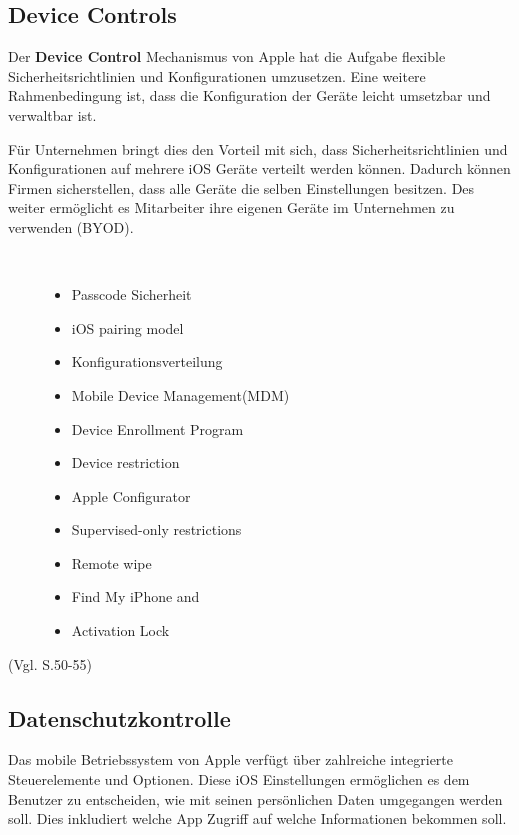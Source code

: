 \subsection{Device Controls}
\label{sec:DeviceControl}

Der \textbf{Device Control} Mechanismus von Apple hat die Aufgabe flexible Sicherheitsrichtlinien und Konfigurationen umzusetzen. Eine weitere Rahmenbedingung ist, dass die Konfiguration der Geräte leicht umsetzbar und verwaltbar ist.\par 
 Für Unternehmen bringt dies den Vorteil mit sich, dass Sicherheitsrichtlinien und Konfigurationen auf mehrere iOS Geräte verteilt werden können. Dadurch können Firmen sicherstellen, dass alle Geräte die selben Einstellungen besitzen. Des weiter ermöglicht es Mitarbeiter ihre eigenen Geräte im Unternehmen zu verwenden (BYOD). 

\begin{description}
    \item[\parbox{\textwidth} {Dies sind die Mainfeature des Apple Device Control Service} ]~\par
    \begin{multicols}{2}
    \begin{itemize}
        \item Passcode Sicherheit
        \item iOS pairing model
        \item Konfigurationsverteilung
        \item Mobile Device Management(MDM)
        \item Device Enrollment Program
        \item Device restriction
        \item Apple Configurator
        \item Supervised-only restrictions
        \item Remote wipe
        \item Find My iPhone and 
        \item Activation Lock
    \end{itemize}
    \end{multicols}
\end{description}
(Vgl. \cite{Apple[4]} S.50-55)

\subsection{Datenschutzkontrolle}
\label{sec:PrivacyControls}
Das mobile Betriebssystem von Apple verfügt über zahlreiche integrierte Steuerelemente und Optionen. Diese iOS Einstellungen ermöglichen es dem Benutzer zu entscheiden, wie mit seinen persönlichen Daten umgegangen werden soll. Dies inkludiert welche App Zugriff auf welche Informationen bekommen soll. 

